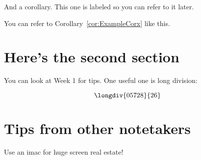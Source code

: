 
\begin{corollary}\label{cor:ExampleCorx} And a corollary.  This one is labeled so you can refer to it later.\end{corollary}

You can refer to Corollary~\ref{cor:ExampleCorx} like this.

\section{Here's the second section}
You can look at Week 1 for tips.  One useful one is long division:

\[
\longdiv{05728}{26}
\]

\section{Tips from other notetakers}

Use an imac for huge screen real estate!